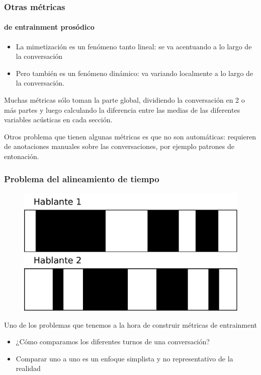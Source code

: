 \begin{frame}
  \frametitle{Otras métricas}
  \framesubtitle{de entrainment prosódico}
  \begin{itemize}
    \item La mimetización es un fenómeno tanto lineal: se va acentuando a lo largo de la conversación
    \item Pero también es un fenómeno dinámico: va variando localmente a lo largo de la conversación.
  \end{itemize}

  Muchas métricas sólo toman la parte global, dividiendo la conversación en 2 o más partes y luego calculando la diferencia entre las medias de las diferentes variables acústicas en cada sección.

  Otros problema que tienen algunas métricas es que no son automáticas: requieren de anotaciones manuales sobre las conversaciones, por ejemplo patrones de entonación.
\end{frame}


\begin{frame}
  \frametitle{Problema del alineamiento de tiempo}

  \begin{figure}[t]
    \includegraphics[scale=0.40]{images/conversation_turns.pdf}
  \end{figure}
  Uno de los problemas que tenemos a la hora de construir métricas de entrainment

  \begin{itemize}
    \item ¿Cómo comparamos los diferentes turnos de una conversación?
    \item Comparar uno a uno es un enfoque simplista y no representativo de la realidad
  \end{itemize}
\end{frame}

